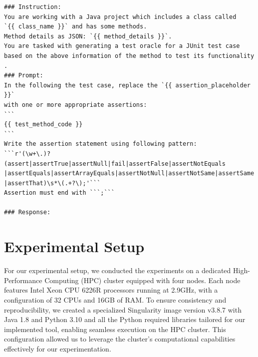 \begin{lstlisting}[style=llm_prompt, label=prompt_template, caption=Prompt Template]
### Instruction:
You are working with a Java project which includes a class called 
`{{ class_name }}` and has some methods.
Method details as JSON: `{{ method_details }}`.
You are tasked with generating a test oracle for a JUnit test case 
based on the above information of the method to test its functionality .
### Prompt:
In the following the test case, replace the `{{ assertion_placeholder }}` 
with one or more appropriate assertions:
```
{{ test_method_code }}
```
Write the assertion statement using following pattern:
```r'(\w+\.)?(assert|assertTrue|assertNull|fail|assertFalse|assertNotEquals
|assertEquals|assertArrayEquals|assertNotNull|assertNotSame|assertSame
|assertThat)\s*\(.+?\);'```
Assertion must end with ```;```

### Response:
\end{lstlisting}

\section{Experimental Setup}
\label{sec:experimental_setup}
\vspace{0.2 cm}

For our experimental setup, we conducted the experiments on a dedicated High-Performance Computing (HPC) cluster equipped with four nodes. Each node features Intel Xeon CPU 6226R\cite{noauthor_intel_nodate} processors running at 2.9GHz, with a configuration of 32 CPUs and 16GB of RAM. To ensure consistency and reproducibility, we created a specialized Singularity\cite{noauthor_introduction_nodate} image version v3.8.7\cite{noauthor_singularity_releases_nodate} with Java 1.8 and Python 3.10 and all the Python required libraries tailored for our implemented tool, enabling seamless execution on the HPC cluster. This configuration allowed us to leverage the cluster's computational capabilities effectively for our experimentation.

